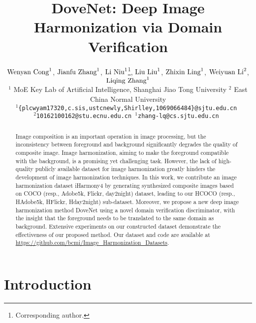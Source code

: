 \documentclass[10pt,twocolumn,letterpaper]{article}
\begin{document}
\title{DoveNet: Deep Image Harmonization via Domain Verification}

\author{$\textnormal{Wenyan Cong}^{1}$, $\textnormal{Jianfu Zhang}^{1}$, $\textnormal{Li Niu}^{1}$\thanks{Corresponding author.}, $\textnormal{Liu Liu}^{1}$, $\textnormal{Zhixin Ling}^{1}$, $\textnormal{Weiyuan Li}^{2}$, $\textnormal{Liqing Zhang}^{1}$\\
$^1$ MoE Key Lab of Artificial Intelligence, Shanghai Jiao Tong University
$^2$ East China Normal University\\
{\tt\small$^1$\{plcwyam17320,c.sis,ustcnewly,Shirlley,1069066484\}@sjtu.edu.cn }\\
{\tt\small$^2$10162100162@stu.ecnu.edu.cn $^1$zhang-lq@cs.sjtu.edu.cn }
}

\maketitle
\thispagestyle{empty}

\begin{abstract}
Image composition is an important operation in image processing, but the inconsistency between foreground and background significantly degrades the quality of composite image. Image harmonization, aiming to make the foreground compatible with the background, is a promising yet challenging task. However, the lack of high-quality publicly available dataset for image harmonization greatly hinders the development of image harmonization techniques. In this work, we contribute an image harmonization dataset iHarmony4 by generating synthesized composite images based on COCO (resp., Adobe5k, Flickr, day2night) dataset, leading to our HCOCO (resp., HAdobe5k, HFlickr, Hday2night) sub-dataset. Moreover, we propose a new deep image harmonization method DoveNet using a novel domain verification discriminator, with the insight that the foreground needs to be translated to the same domain as background. Extensive experiments on our constructed dataset demonstrate the effectiveness of our proposed method. Our dataset and code are available at \href{https://github.com/bcmi/Image\_Harmonization\_Datasets}{https://github.com/bcmi/Image\_Harmonization\_Datasets}.
\end{abstract}



\section{Introduction} \label{sec:intro}
\end{document}
